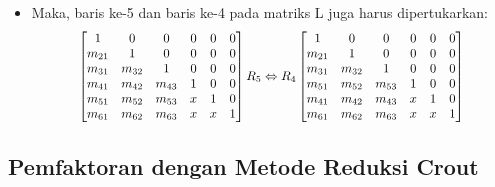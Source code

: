 \documentclass[pdflatex,compress,mathserif]{beamer}
\newcommand*{\Scale}[2][4]{\scalebox{#1}{$#2$}}%
\begin{document}
\begin{frame}
	\begin{itemize}
		\item Maka, baris ke-5 dan baris ke-4 pada matriks L juga harus dipertukarkan:
		\[\Scale[0.9]{
		\begin{bmatrix}
			1 & 0 & 0 & 0 & 0 & 0 \\
			m_{21} & 1 & 0 & 0 & 0 & 0 \\
			m_{31} & m_{32} & 1 & 0 & 0 & 0 \\
			m_{41} & m_{42} & m_{43} & 1 & 0 & 0 \\
			m_{51} & m_{52} & m_{53} & x & 1 & 0 \\
			m_{61} & m_{62} & m_{63} & x & x & 1
		\end{bmatrix}
		R_5 \Leftrightarrow R_4
		\begin{bmatrix}
			1 & 0 & 0 & 0 & 0 & 0 \\
			m_{21} & 1 & 0 & 0 & 0 & 0 \\
			m_{31} & m_{32} & 1 & 0 & 0 & 0 \\
			m_{51} & m_{52} & m_{53} & 1 & 0 & 0 \\
			m_{41} & m_{42} & m_{43} & x & 1 & 0 \\
			m_{61} & m_{62} & m_{63} & x & x & 1
		\end{bmatrix}
		}\]
	\end{itemize}
\end{frame}

\subsection{Pemfaktoran dengan Metode Reduksi Crout}
\end{document}

